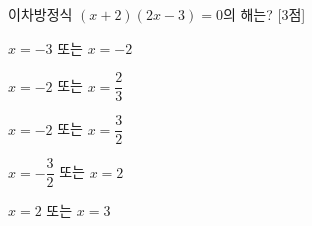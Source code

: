 이차방정식 $(x+2)(2x-3)=0$의 해는? \mbox{[3점]}
\begin{choicesii}{\rule[-3ex]{0pt}{8ex}$x=-3$ 또는 $x=-2$}{\rule[-3ex]{0pt}{8ex}$x=-2$ 또는 $x=\dfrac{2}{3}$}{\rule[-3ex]{0pt}{8ex}$x=-2$ 또는 $x=\dfrac{3}{2}$}{\rule[-3ex]{0pt}{8ex}$x=-\dfrac{3}{2}$ 또는 $x=2$}{\rule[-3ex]{0pt}{8ex}$x=2$ 또는 $x=3$}\end{choicesii}
